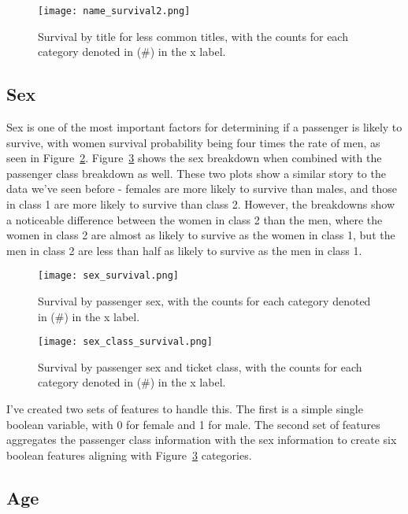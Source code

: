 \documentclass[12pt, letterpaper]{article}
\begin{document}
\begin{figure}[H]
    \centering
    \texttt{[image: name\_survival2.png]}
    \caption{Survival by title for less common titles, with the counts for each category denoted in (\#) in the x label. }
    \label{fig:name_prob2}
\end{figure}

\subsection{Sex}

Sex is one of the most important factors for determining if a passenger is likely to survive, with women survival probability being four times the rate of men, as seen in Figure~\ref{fig:sex_prob}. Figure~\ref{fig:sex_class_prob} shows the sex breakdown when combined with the passenger class breakdown as well. These two plots show a similar story to the data we've seen before - females are more likely to survive than males, and those in class 1 are more likely to survive than class 2. However, the breakdowns show a noticeable difference between the women in class 2 than the men, where the women in class 2 are almost as likely to survive as the women in class 1, but the men in class 2 are less than half as likely to survive as the men in class 1. 

\begin{figure}[H]
    \centering
    \texttt{[image: sex\_survival.png]}
    \caption{Survival by passenger sex, with the counts for each category denoted in (\#) in the x label. }
    \label{fig:sex_prob}
\end{figure}

\begin{figure}[H]
    \centering
    \texttt{[image: sex\_class\_survival.png]}
    \caption{Survival by passenger sex and ticket class, with the counts for each category denoted in (\#) in the x label. }
    \label{fig:sex_class_prob}
\end{figure}

I've created two sets of features to handle this. The first is a simple single boolean variable, with 0 for female and 1 for male. The second set of features aggregates the passenger class information with the sex information to create six boolean features aligning with Figure~\ref{fig:sex_class_prob} categories.

\subsection{Age}
\end{document}
